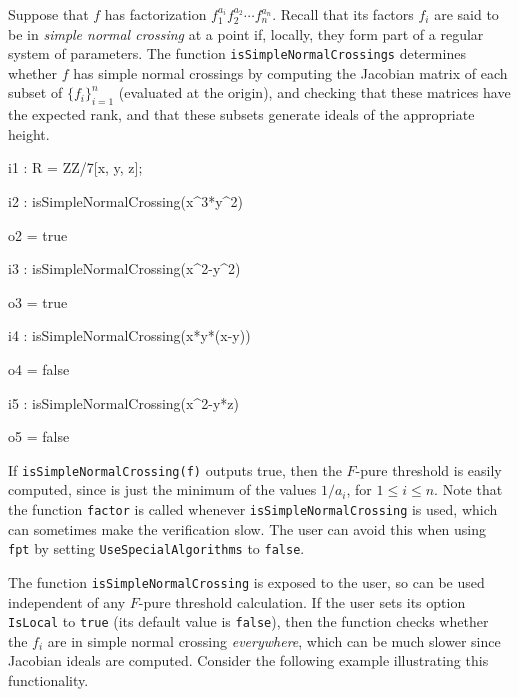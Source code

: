 \documentclass{amsart}
\begin{document}
Suppose that $f$ has factorization $f_1^{a_i} f_2^{a_2} \cdots f_n^{a_n}$.  Recall that its factors $f_i$ are said to be in 
\emph{simple normal crossing} at a point if, locally, they form part of a regular system of parameters.  The function {\tt isSimpleNormalCrossings} determines whether $f$ has simple normal crossings by computing the Jacobian matrix of each subset of $\{ f_i \}_{i=1}^n$ (evaluated at the origin), and checking that these matrices have the expected rank, and that these subsets generate ideals of the appropriate height.

{\small
{}
\begin{MyVerbatim}

i1 : R = ZZ/7[x, y, z];

i2 : isSimpleNormalCrossing(x^3*y^2)

o2 = true

i3 : isSimpleNormalCrossing(x^2-y^2)

o3 = true

i4 : isSimpleNormalCrossing(x*y*(x-y))

o4 = false

i5 : isSimpleNormalCrossing(x^2-y*z)

o5 = false
\end{MyVerbatim}
}
\medspace

            
If {\tt isSimpleNormalCrossing(f)} outputs true, then the $F$-pure threshold is easily computed, since is just the minimum of the values $1/a_i$, for $1 \leq i \leq n$.
Note that the function {\tt factor} is called whenever {\tt isSimpleNormalCrossing} is used, which can sometimes make the verification slow.  The user can avoid this when using {\tt fpt} by setting {\tt UseSpecialAlgorithms} to {\tt false}.

The function {\tt isSimpleNormalCrossing} is exposed to the user, so can be used independent of any $F$-pure threshold calculation.  
If the user sets its option {\tt IsLocal} to {\tt true} (its default value is {\tt false}), then the function checks whether the $f_i$ are in simple normal crossing \emph{everywhere}, which can be much slower since Jacobian ideals are computed. Consider the following example illustrating this functionality.
\end{document}
